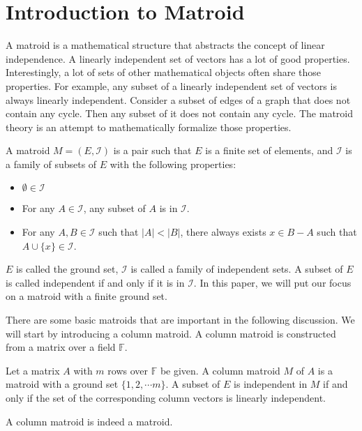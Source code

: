 \section{Introduction to Matroid}

A matroid is a mathematical structure that abstracts the concept of linear independence.
A linearly independent set of vectors has a lot of good properties.
Interestingly, a lot of sets of other mathematical objects often share those properties.
For example, any subset of a linearly independent set of vectors is always linearly independent.
Consider a subset of edges of a graph that does not contain any cycle.
Then any subset of it does not contain any cycle.
The matroid theory is an attempt to mathematically formalize those properties.

\begin{defn}
A matroid $M = (E, \mathcal{I})$ is a pair such that $E$ is a finite set of elements, and $\mathcal{I}$ is a family of subsets of $E$ with the following properties:
\begin{itemize}
\item $\emptyset \in \mathcal{I}$
\item For any $A\in \mathcal{I}$, any subset of $A$ is in $\mathcal{I}$.
\item For any $A, B \in \mathcal{I}$ such that $\lvert A \rvert < \lvert B \rvert$, there always exists $x \in B - A$ such that $A \cup \{ x \} \in \mathcal{I}$.
\end{itemize}
\end{defn}
$E$ is called the ground set, $\mathcal{I}$ is called a family of independent sets. A subset of $E$ is called independent if and only if it is in $\mathcal{I}$.
In this paper, we will put our focus on a matroid with a finite ground set. 


There are some basic matroids that are important in the following discussion.
We will start by introducing a column matroid. 
A column matroid is constructed from a matrix over a field $\mathbb{F}$.

\begin{defn}
Let a matrix $A$ with $m$ rows over $\mathbb{F}$ be given.
A column matroid $M$ of $A$ is a matroid with a ground set $\{ 1, 2, \cdots m \}$.
A subset of $E$ is independent in $M$ if and only if the set of the corresponding column vectors is linearly independent.
\end{defn}

\begin{thm}
A column matroid is indeed a matroid.
\end{thm}

